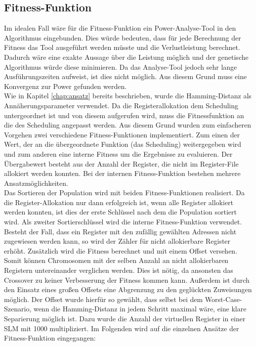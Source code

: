 \subsection{Fitness-Funktion}
\label{chap:Fitness-Funktion}
Im idealen Fall wäre für die Fitness-Funktion ein Power-Analyse-Tool in den Algorithmus eingebunden. Dies würde bedeuten, dass für jede Berechnung der Fitness das Tool ausgeführt werden müsste und die Verlustleistung berechnet. Dadurch wäre eine exakte Aussage über die Leistung möglich und der genetische Algorithmus würde diese minimieren. Da das Analyse-Tool jedoch sehr lange Ausführungszeiten aufweist, ist dies nicht möglich. Aus diesem Grund muss eine Konvergenz zur Power gefunden werden.\\
Wie in Kapitel \ref{chap:ansatz} bereits beschrieben, wurde die Hamming-Distanz als Annäherungsparameter verwendet. Da die Registerallokation dem Scheduling untergeordnet ist und von diesem aufgerufen wird, muss die Fitnessfunktion an die des Scheduling angepasst werden. Aus diesem Grund wurden zum einfacheren Vorgehen zwei verschiedene Fitness-Funktionen implementiert. Zum einen der Wert, der an die übergeordnete Funktion (das Scheduling) weitergegeben wird und zum anderen eine interne Fitness um die Ergebnisse zu evaluieren.
Der Übergabewert besteht aus der Anzahl der Register, die nicht im Register-File allokiert werden konnten. Bei der internen Fitness-Funktion bestehen mehrere Ansatzmöglichkeiten.\\
Das Sortieren der Population wird mit beiden Fitness-Funktionen realisiert. Da die Register-Allokation nur dann erfolgreich ist, wenn alle Register allokiert werden konnten, ist dies der erste Schlüssel nach dem die Population sortiert wird. Als zweiter Sortierschlüssel wird die interne Fitness-Funktion verwendet.
Besteht der Fall, dass ein Register mit den zufällig gewählten Adressen nicht zugewiesen werden kann, so wird der Zähler für nicht allokierbare Register erhöht. Zusätzlich wird die Fitness berechnet und mit einem Offset versehen. Somit können Chromosomen mit der selben Anzahl an nicht allokierbaren Registern untereinander verglichen werden. Dies ist nötig, da ansonsten das Crossover zu keiner Verbesserung der Fitness kommen kann. Außerdem ist durch den Einsatz eines großen Offsets eine Abgrenzung zu den geglückten Zuweisungen möglich. Der Offset wurde hierfür  so gewählt, dass selbst bei dem Worst-Case-Szenario, wenn die Hamming-Distanz in jedem Schritt maximal wäre, eine klare Separierung möglich ist. Dazu wurde die Anzahl der virtuellen Register in einer SLM mit 1000 multipliziert.
Im Folgenden wird auf die einzelnen Ansätze der Fitness-Funktion eingegangen:

